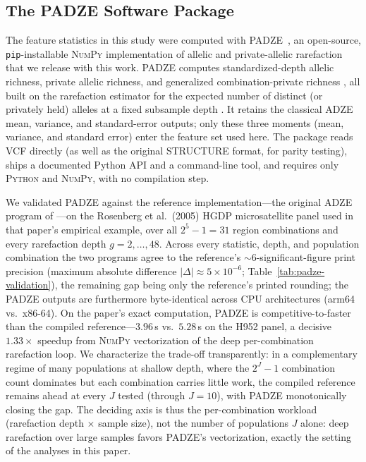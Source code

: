 \documentclass[11pt]{article}
\theoremstyle{plain}
\theoremstyle{definition}
\theoremstyle{remark}
\begin{document}
\subsection{The PADZE Software Package}
\label{subsec:padze-software}

The feature statistics in this study were computed with \textsc{PADZE}~\citep{padze2026}, an
open-source, \texttt{pip}-installable \textsc{NumPy} implementation of allelic and
private-allelic rarefaction that we release with this work. \textsc{PADZE} computes
standardized-depth allelic richness, private allelic richness, and generalized
combination-private richness \citep{szpiech2008adze}, all built on the rarefaction
estimator for the expected number of distinct (or privately held) alleles at a fixed
subsample depth \citep{kalinowski2004counting}. It retains the classical ADZE mean,
variance, and standard-error outputs; only these three moments (mean, variance, and standard
error) enter the feature set used here. The package reads VCF directly (as well as
the original STRUCTURE format, for parity testing), ships a documented Python API and a
command-line tool, and requires only \textsc{Python} and \textsc{NumPy}, with no
compilation step.

We validated \textsc{PADZE} against the reference implementation---the original ADZE
program of \citet{szpiech2008adze}---on the Rosenberg et al.\ (2005) HGDP microsatellite
panel used in that paper's empirical example, over all $2^{5}-1=31$ region combinations
and every rarefaction depth $g=2,\dots,48$. Across every statistic, depth, and population
combination the two programs agree to the reference's $\sim$6-significant-figure print
precision (maximum absolute difference $|\Delta|\approx 5\times10^{-6}$;
Table~\ref{tab:padze-validation}), the remaining gap being only the reference's printed
rounding; the \textsc{PADZE} outputs are furthermore byte-identical across CPU
architectures (arm64 vs.\ x86-64). On the paper's exact computation, \textsc{PADZE} is
competitive-to-faster than the compiled reference---$3.96$\,s vs.\ $5.28$\,s on the H952
panel, a decisive $1.33\times$ speedup from \textsc{NumPy} vectorization of the deep
per-combination rarefaction loop. We characterize the trade-off transparently: in a
complementary regime of many populations at shallow depth, where the $2^{J}-1$
combination count dominates but each combination carries little work, the compiled
reference remains ahead at every $J$ tested (through $J=10$), with \textsc{PADZE}
monotonically closing the gap. The deciding axis is thus the per-combination workload
(rarefaction depth $\times$ sample size), not the number of populations $J$ alone: deep
rarefaction over large samples favors \textsc{PADZE}'s vectorization, exactly the setting
of the analyses in this paper.
\end{document}
